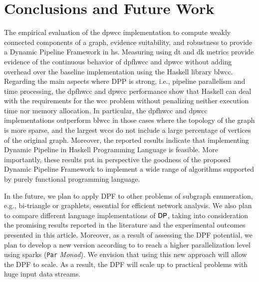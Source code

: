 \section{Conclusions and Future Work}\label{conc}
The empirical evaluation of the \acrshort{dpwcc} implementation to compute weakly connected components of a graph, evidence suitability, and robustness to provide a Dynamic Pipeline Framework in \acrshort{hs}. Measuring  using \acrshort{dt} and \acrshort{dk} metrics  provide evidence of the continuous behavior of \acrshort{dpfhwcc} and \acrshort{dpwcc} without adding overhead over the baseline implementation using the Haskell  library \acrshort{blwcc}. Regarding the main aspects where DPP is strong, i.e., pipeline parallelism and time processing, the \acrshort{dpfhwcc} and \acrshort{dpwcc}  performance show that Haskell can deal with the requirements for the \acrshort{wcc} problem without penalizing neither execution time nor memory allocation. In particular, the \acrshort{dpfhwcc} and \acrshort{dpwcc}  implementations outperform \acrshort{blwcc} in those cases where the topology of the graph is more sparse, and the largest \acrshort{wcc}s do not include a large percentage of vertices of the original graph. Moreover, the reported results indicate that implementing Dynamic Pipeline in Haskell Programming Language is feasible. More importantly, these results put in perspective the goodness of the proposed Dynamic Pipeline Framework to implement a wide range of algorithms supported by purely functional programming language.

In the future, we plan to apply DPF to other problems of subgraph enumeration, e.g., bi-triangle or graphlets, essential for efficient network analysis. We also plan to compare different language implementations of $\mathsf{DP}$, taking into consideration the promising results reported in the literature \cite{dpp_triangles} and the experimental outcomes presented in this article.
Moreover, as a result of assessing the DPF potential, we plan to develop a new version according to \cite{parallelbook} to reach a higher parallelization level using sparks (\texttt{Par} \textit{Monad}). We envision that using this new approach will allow the DPF to scale. As a result, the DPF will scale up to practical problems with huge input data streams. 

